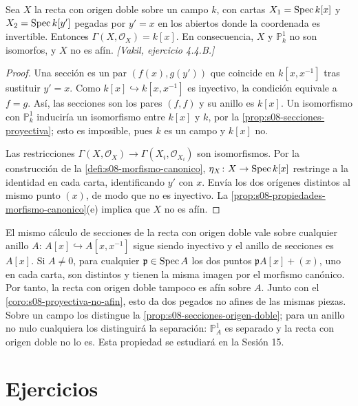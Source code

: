 \begin{prop}
\label{prop:s08-secciones-origen-doble}
Sea $X$ la recta con origen doble sobre un campo $k$, con cartas $X_1=\operatorname{Spec} k[x]$ y $X_2=\operatorname{Spec} k[y']$ pegadas por $y'=x$ en los abiertos donde la coordenada es invertible. Entonces $\Gamma(X,\mathcal O_X)=k[x]$. En consecuencia, $X$ y $\mathbb P_k^1$ no son isomorfos, y $X$ no es afín. \emph{[Vakil, ejercicio 4.4.B.]}
\end{prop}
\begin{proof}
Una sección es un par $(f(x),g(y'))$ que coincide en $k[x,x^{-1}]$ tras sustituir $y'=x$. Como $k[x]\hookrightarrow k[x,x^{-1}]$ es inyectivo, la condición equivale a $f=g$. Así, las secciones son los pares $(f,f)$ y su anillo es $k[x]$. Un isomorfismo con $\mathbb P_k^1$ induciría un isomorfismo entre $k[x]$ y $k$, por la \cref{prop:s08-secciones-proyectiva}; esto es imposible, pues $k$ es un campo y $k[x]$ no.

Las restricciones $\Gamma(X,\mathcal O_X)\to\Gamma(X_i,\mathcal O_{X_i})$ son isomorfismos. Por la construcción de la \cref{defi:s08-morfismo-canonico}, $\eta_X\colon X\to\operatorname{Spec} k[x]$ restringe a la identidad en cada carta, identificando $y'$ con $x$. Envía los dos orígenes distintos al mismo punto $(x)$, de modo que no es inyectivo. La \cref{prop:s08-propiedades-morfismo-canonico}(e) implica que $X$ no es afín.
\end{proof}

\begin{obs}
\label{obs:s08-dos-pegados-anillo}
El mismo cálculo de secciones de la recta con origen doble vale sobre cualquier anillo $A$: $A[x]\hookrightarrow A[x,x^{-1}]$ sigue siendo inyectivo y el anillo de secciones es $A[x]$. Si $A\ne0$, para cualquier $\mathfrak p\in\operatorname{Spec} A$ los dos puntos $\mathfrak pA[x]+(x)$, uno en cada carta, son distintos y tienen la misma imagen por el morfismo canónico. Por tanto, la recta con origen doble tampoco es afín sobre $A$. Junto con el \cref{coro:s08-proyectiva-no-afin}, esto da dos pegados no afines de las mismas piezas. Sobre un campo los distingue la \cref{prop:s08-secciones-origen-doble}; para un anillo no nulo cualquiera los distinguirá la separación: $\mathbb P_A^1$ es separado y la recta con origen doble no lo es. Esta propiedad se estudiará en la Sesión 15.
\end{obs}

\section{Ejercicios}

